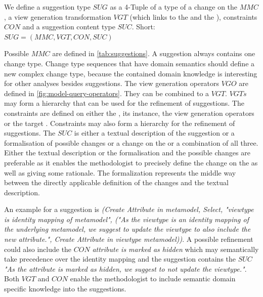 \begin{definition}\label{def:suggestion}
We define a suggestion type $SUG$ as a 4-Tuple of a type of a change on the \metamodel $MMC$, a view generation transformation $VGT$ (which links to the \metamodel and the \viewtype),  constraints $CON$ and a suggestion content type $SUC$. Short: $SUG = (MMC, VGT, CON, SUC)$
\end{definition}
Possible $MMC$ are defined in \cref{tab:suggestions}. A suggestion always contains one change type. Change type sequences that have domain semantics should define a new complex change type, because the contained domain knowledge is interesting for other analyses besides suggestions. The view generation operators $VGO$ are defined in \cref{fig:model-query-operators}. They can be combined to a $VGT$. $VGTs$ may form a hierarchy that can be used for the refinement of suggestions. The constraints are defined on either the \metamodel, its instance, the view generation operators or the target \viewtype \metamodel. Constraints may also form a hierarchy for the refinement of suggestions. The $SUC$ is either a textual description of the suggestion or a formalisation of possible changes or a change on the \viewtype \metamodel or a combination of all three. Either the textual description or the formalisation and the possible changes are preferable as it enables the methodologist to precisely define the change on the \viewtype \metamodel as well as giving some rationale. The formalization represents the middle way between the directly applicable definition of the changes and the textual description.

An example for a suggestion is \textit{(Create Attribute in metamodel, Select,  "viewtype is identity mapping of metamodel", ("As the viewtype is an identity mapping of the underlying metamodel, we suggest to update the viewtype to also include the new attribute.", Create Attribute in viewtype metamodel))}. A possible refinement could also include the $CON$ \textit{attribute is marked as hidden} which may semantically take precedence over the identity mapping and the suggestion contains the $SUC$ \textit{"As the attribute is marked as hidden, we suggest to not update the viewtype."}. Both $VGT$ and $CON$ enable the methodologist to include semantic domain specific knowledge into the suggestions.


